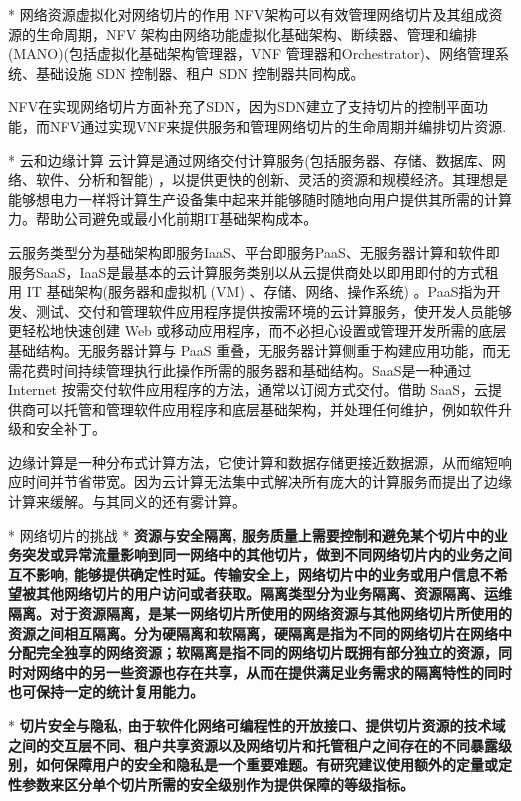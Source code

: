         * 网络资源虚拟化对网络切片的作用
            NFV架构可以有效管理网络切片及其组成资源的生命周期，NFV 架构由网络功能虚拟化基础架构、断续器、管理和编排(MANO)(包括虚拟化基础架构管理器，VNF 管理器和Orchestrator)、网络管理系统、基础设施 SDN 控制器、租户 SDN 控制器共同构成。
            
            NFV在实现网络切片方面补充了SDN，因为SDN建立了支持切片的控制平面功能，而NFV通过实现VNF来提供服务和管理网络切片的生命周期并编排切片资源.

    * 云和边缘计算
        云计算是通过网络交付计算服务(包括服务器、存储、数据库、网络、软件、分析和智能) ，以提供更快的创新、灵活的资源和规模经济。其理想是能够想电力一样将计算生产设备集中起来并能够随时随地向用户提供其所需的计算力。帮助公司避免或最小化前期IT基础架构成本。

        云服务类型分为基础架构即服务IaaS、平台即服务PaaS、无服务器计算和软件即服务SaaS，IaaS是最基本的云计算服务类别以从云提供商处以即用即付的方式租用 IT 基础架构(服务器和虚拟机 (VM) 、存储、网络、操作系统) 。PaaS指为开发、测试、交付和管理软件应用程序提供按需环境的云计算服务，使开发人员能够更轻松地快速创建 Web 或移动应用程序，而不必担心设置或管理开发所需的底层基础结构。无服务器计算与 PaaS 重叠，无服务器计算侧重于构建应用功能，而无需花费时间持续管理执行此操作所需的服务器和基础结构。SaaS是一种通过 Internet 按需交付软件应用程序的方法，通常以订阅方式交付。借助 SaaS，云提供商可以托管和管理软件应用程序和底层基础架构，并处理任何维护，例如软件升级和安全补丁。

        边缘计算是一种分布式计算方法，它使计算和数据存储更接近数据源，从而缩短响应时间并节省带宽。因为云计算无法集中式解决所有庞大的计算服务而提出了边缘计算来缓解。与其同义的还有雾计算。


* 网络切片的挑战
    * \bf{资源与安全隔离}, 服务质量上需要控制和避免某个切片中的业务突发或异常流量影响到同一网络中的其他切片，做到不同网络切片内的业务之间互不影响, 能够提供确定性时延。传输安全上，网络切片中的业务或用户信息不希望被其他网络切片的用户访问或者获取。隔离类型分为业务隔离、资源隔离、运维隔离。对于资源隔离，是某一网络切片所使用的网络资源与其他网络切片所使用的资源之间相互隔离。分为硬隔离和软隔离，硬隔离是指为不同的网络切片在网络中分配完全独享的网络资源；软隔离是指不同的网络切片既拥有部分独立的资源，同时对网络中的另一些资源也存在共享，从而在提供满足业务需求的隔离特性的同时也可保持一定的统计复用能力。

    * \bf{切片安全与隐私}, 由于软件化网络可编程性的开放接口、提供切片资源的技术域之间的交互层不同、租户共享资源以及网络切片和托管租户之间存在的不同暴露级别，如何保障用户的安全和隐私是一个重要难题。有研究建议使用额外的定量或定性参数来区分单个切片所需的安全级别作为提供保障的等级指标。

